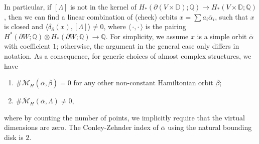 \documentclass[reqno,11pt]{amsart}
\numberwithin{equation}{section}
\def\D{{\mathbb D}}
\def\Q{{\mathbb Q}}
\def\cM{{\mathcal M}}
\def\la{\langle\,}
\def\ra{\,\rangle}
\begin{document}
In particular, if $[\Lambda]$ is not in the kernel of $H_*(\partial(V\times \D);\Q)\to H_*(V\times \D;\Q)$, then we can find a linear combination of (check) orbits $x=\sum a_i\overline{\alpha}_i$, such that $x$ is closed and $\langle \delta_{\partial}(x), [\Lambda]\rangle\ne 0$, where $\la \cdot,\cdot\ra$ is the pairing $H^*(\partial W;\Q)\otimes H_*(\partial W;\Q)\to \Q$. For simplicity, we assume $x$ is a simple orbit $\overline{\alpha}$ with coefficient $1$; otherwise, the argument in the general case only differs in notation.  As a consequence, for generic choices of almost complex structures, we have 
\begin{enumerate}
	\item $\#\overline{\cM}_H(\overline{\alpha},\overline{\beta})=0$ for any other non-constant Hamiltonian orbit $\overline{\beta}$;
	\item $\#\overline{\cM}_H(\overline{\alpha},\Lambda) \ne 0$,
\end{enumerate}	 
where by counting the number of points, we implicitly require that the virtual dimensions are zero. The Conley-Zehnder index of $\overline{\alpha}$ using the natural bounding disk is $2$. 
\end{document}
